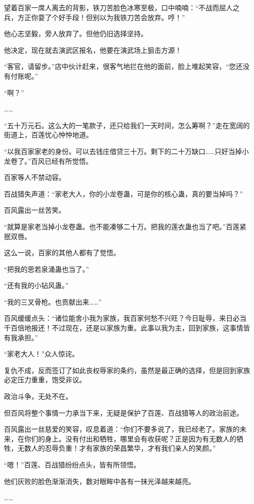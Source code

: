 \begin{this_body}
望着百家一席人离去的背影，铁刀苦脸色冰寒至极，口中喃喃：“不战而屈人之兵，方正你耍了个好手段！但别以为我铁刀苦会放弃。哼！”

他心志坚毅，旁人放弃了。但他仍旧选择坚持。

他决定，现在就去演武区报名，他要在演武场上狙击方源！

“客官，请留步。”店中伙计赶来，很客气地拦在他的面前，脸上堆起笑容，“您还没有付账呢。”

“啊？”

……

“五十万元石。这么大的一笔款子，还只给我们一天时间，怎么筹啊？”走在宽阔的街道上，百莲忧心忡忡地道。

“以我百家家老的身份。可以去钱庄借贷三十万。剩下的二十万缺口……只好当掉小龙卷了。”百风已经有所觉悟。

百家等人不禁动容。

百战猎失声道：“家老大人，你的小龙卷蛊，可是你的核心蛊，真的要当掉吗？”

百风露出一丝苦笑。

“就算是家老当掉小龙卷蛊。也不能凑够二十万。把我的莲衣蛊也当了吧。”百莲紧抿双唇。

这么一说，百家的其他人都有了觉悟。

“把我的思若泉涌蛊也当了。”

“还有我的小钻风蛊。”

“我的三叉骨枪。也贡献出来……”

百风缓缓点头：“诸位能舍小我为家族，我百家何愁不兴旺？今日耻辱，来日必当千百倍地报还！不过现在，还是以家族为重。此事以我为主，回到家族，这事情皆有我承担。”

“家老大人！”众人惊诧。

复仇不成，反而签订了如此丧权辱家的条约，虽然是最正确的选择，但是回到家族必定压力重重，饱受非议。

政治斗争，无处不在。

但百风将整个事情一力承当下来，无疑是保护了百莲、百战猎等人的政治前途。

百风露出一丝慈爱的笑容，叹息着道：“你们不要多说了，我已经老了。家族的未来，在你们的身上。没有付出和牺牲，哪里会有收获呢？正是因为有无数人的牺牲，无数人的忍辱负重！才有家族的荣昌繁华，才有我们亲人的笑颜。”

“嗯！”百莲、百战猎纷纷点头，皆有所领悟。

他们灰败的脸色渐渐消失，数对眼眸中各有一抹光泽越来越亮。

……


\end{this_body}
